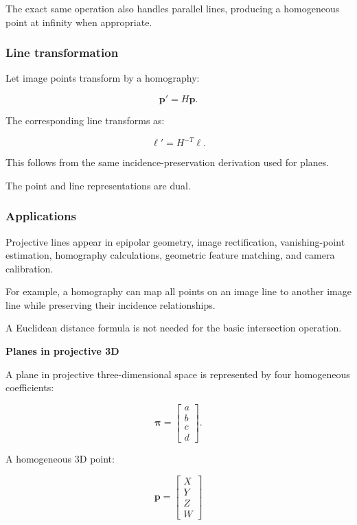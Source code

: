 The exact same operation also handles parallel lines, producing a homogeneous point at infinity when appropriate.

\subsubsection{Line transformation}\label{02-foundations-ii-ch032-line-transformation}

\hypertarget{02-foundations-ii-ch032-line-transformation}{}

Let image points transform by a homography:

\[
 \mathbf p'=H\mathbf p.
\]

The corresponding line transforms as:

\[
 \boxed{ \boldsymbol\ell'=H^{-T}\boldsymbol\ell }.
\]

This follows from the same incidence-preservation derivation used for planes.

The point and line representations are dual.

\subsubsection{Applications}\label{02-foundations-ii-ch032-applications}

\hypertarget{02-foundations-ii-ch032-applications}{}

Projective lines appear in epipolar geometry, image rectification, vanishing-point estimation, homography calculations, geometric feature matching, and camera calibration.

For example, a homography can map all points on an image line to another image line while preserving their incidence relationships.

A Euclidean distance formula is not needed for the basic intersection operation.

\textbf{Planes in projective 3D}

A plane in projective three-dimensional space is represented by four homogeneous coefficients:

\[
 \boxed{ \boldsymbol\pi= \begin{bmatrix} a\\b\\c\\d \end{bmatrix} }.
\]

A homogeneous 3D point:

\[
 \mathbf p= \begin{bmatrix} X\\Y\\Z\\W \end{bmatrix}
\]


